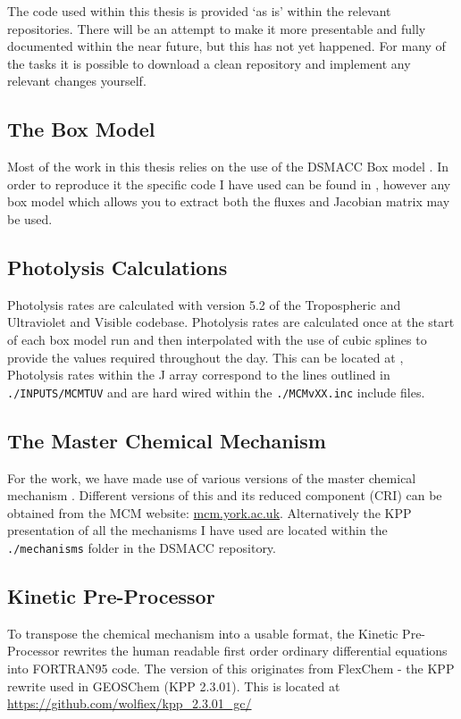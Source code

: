 The code used within this thesis is provided `as is' within the relevant repositories. There will be an attempt to make it more presentable and fully documented within the near future, but this has not yet happened. For many of the tasks it is possible to download a clean repository and implement any relevant changes yourself.

\subsection*{The Box Model}

Most of the work in this thesis relies on the use of the DSMACC Box model \citep{dsmacc}. In order to reproduce it the specific code I have used can be found in \citep{dsmaccgit}, however any box model which allows you to extract both the fluxes and Jacobian matrix may be used.

\subsection*{Photolysis Calculations}

Photolysis rates are calculated with version 5.2 of the Tropospheric and Ultraviolet and Visible codebase. Photolysis rates are calculated once at the start of each box model run and then interpolated with the use of cubic splines to provide the values required throughout the day. This can be located at \citep{tuv}, Photolysis rates within the J array correspond to the lines outlined in \verb|./INPUTS/MCMTUV| and are hard wired within the \verb|./MCMvXX.inc| include files.

\subsection*{The Master Chemical Mechanism}
For the work, we have made use of various versions of the master chemical mechanism \citep{mcm}. Different versions of this and its reduced component (CRI) can be obtained from the MCM website: \url{mcm.york.ac.uk}. Alternatively the KPP presentation of all the mechanisms I have used are located within the \verb|./mechanisms| folder in the DSMACC repository.


\subsection*{Kinetic Pre-Processor}
To transpose the chemical mechanism into a usable format, the Kinetic Pre-Processor rewrites the human readable first order ordinary differential equations into FORTRAN95 code. The version of this originates from FlexChem  - the KPP rewrite used in GEOSChem (KPP 2.3.01). This is located at \url{https://github.com/wolfiex/kpp_2.3.01_gc/}

